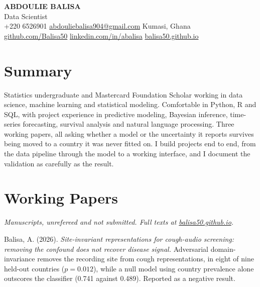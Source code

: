 \documentclass[a4paper,10pt]{article}
\begin{document}
\begin{center}
  {\fontsize{17.2}{20}\selectfont\bfseries ABDOULIE BALISA}\\[0.35em]
  {\normalsize Data Scientist}\\[0.45em]
  {\small +220 6526901 \textbar{} \href{mailto:abdouliebalisa904@gmail.com}{abdouliebalisa904@gmail.com} \textbar{} Kumasi, Ghana}\\[0.2em]
  {\small \href{https://github.com/Balisa50}{github.com/Balisa50} \textbar{} \href{https://linkedin.com/in/abalisa}{linkedin.com/in/abalisa} \textbar{} \href{https://balisa50.github.io}{balisa50.github.io}}
\end{center}

\vspace{0.4em}

\section{Summary}

Statistics undergraduate and Mastercard Foundation Scholar working in data
science, machine learning and statistical modeling. Comfortable in Python, R
and SQL, with project experience in predictive modeling, Bayesian inference,
time-series forecasting, survival analysis and natural language processing.
Three working papers, all asking whether a model or the uncertainty it reports
survives being moved to a country it was never fitted on. I build projects end
to end, from the data pipeline through the model to a working interface, and I
document the validation as carefully as the result.

\section{Working Papers}

\textit{Manuscripts, unrefereed and not submitted. Full texts at
\href{https://balisa50.github.io/\#papers}{balisa50.github.io}.}

\vspace{0.45em}

Balisa, A. (2026). \textit{Site-invariant representations for cough-audio
screening: removing the confound does not recover disease signal.} Adversarial
domain-invariance removes the recording site from cough representations, in
eight of nine held-out countries ($p = 0.012$), while a null model using
country prevalence alone outscores the classifier (0.741 against 0.489).
Reported as a negative result.
\end{document}
